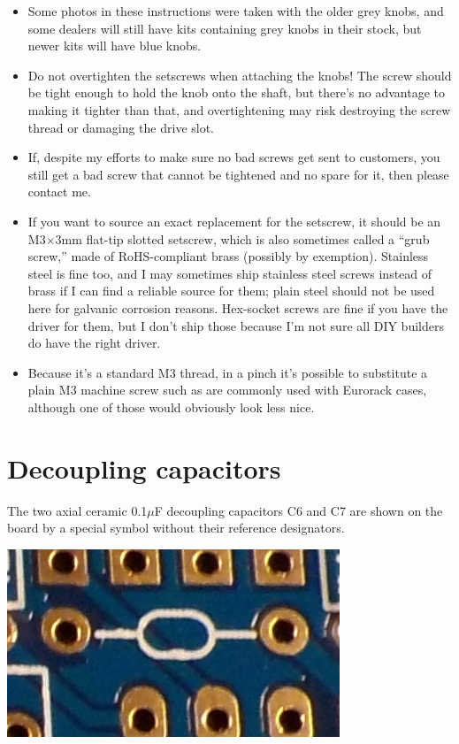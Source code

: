 \begin{itemize}
\item Some photos in these instructions were taken with the older grey
knobs, and some dealers will still have kits containing grey knobs in their
stock, but newer kits will have blue knobs.

\item Do not overtighten the setscrews when attaching the knobs!  The screw
should be tight enough to hold the knob onto the shaft, but there's no
advantage to making it tighter than that, and overtightening may risk
destroying the screw thread or damaging the drive slot.

\item If, despite my efforts to make sure no bad screws get sent to
customers, you still get a bad screw that cannot be tightened and no spare
for it, then please contact me.

\item If you want to source an exact replacement for the setscrew, it should
be an M3$\times$3mm flat-tip slotted setscrew, which is also sometimes
called a ``grub screw,'' made of RoHS-compliant brass (possibly by
exemption).  Stainless steel is fine too, and I may sometimes ship stainless
steel screws instead of brass if I can find a reliable source for them;
plain steel should not be used here for galvanic corrosion reasons. 
Hex-socket screws are fine if you have the driver for them, but I don't ship
those because I'm not sure all DIY builders do have the right driver.

\item Because it's a standard M3 thread, in a pinch it's possible to
substitute a plain M3 machine screw such as are commonly used with Eurorack
cases, although one of those would obviously look less nice.
\end{itemize}

\pagebreak

\section{Decoupling capacitors}

The two axial ceramic 0.1$\mu$F decoupling capacitors C6 and C7 are shown on
the board by a special symbol without their reference designators.

\nopagebreak
\noindent\includegraphics[width=\linewidth]{decoup-symbol.jpg}

